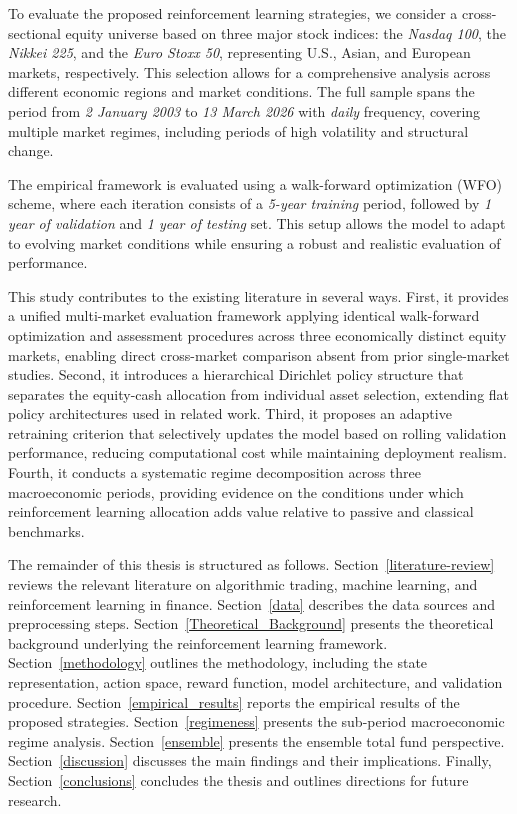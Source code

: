 \documentclass[]{elsarticle}
\begin{document}
To evaluate the proposed reinforcement learning strategies, we consider a cross-sectional equity universe based on three major stock indices: the \textit{Nasdaq 100}, the \textit{Nikkei 225}, and the \textit{Euro Stoxx 50}, representing U.S., Asian, and European markets, respectively. This selection allows for a comprehensive analysis across different economic regions and market conditions. The full sample spans the period from \textit{2 January 2003} to \textit{13 March 2026} with \textit{daily} frequency, covering multiple market regimes, including periods of high volatility and structural change.

The empirical framework is evaluated using a walk-forward optimization (WFO) scheme, where each iteration consists of a \textit{5-year training} period, followed by \textit{1 year of validation} and \textit{1 year of testing} set. This setup allows the model to adapt to evolving market conditions while ensuring a robust and realistic evaluation of performance.

This study contributes to the existing literature in several ways. First, it provides a unified multi-market evaluation framework applying identical walk-forward optimization and assessment procedures across three economically distinct equity markets, enabling direct cross-market comparison absent from prior single-market studies. Second, it introduces a hierarchical Dirichlet policy structure that separates the equity-cash allocation from individual asset selection, extending flat policy architectures used in related work. Third, it proposes an adaptive retraining criterion that selectively updates the model based on rolling validation performance, reducing computational cost while maintaining deployment realism. Fourth, it conducts a systematic regime decomposition across three macroeconomic periods, providing evidence on the conditions under which reinforcement learning allocation adds value relative to passive and classical benchmarks.

The remainder of this thesis is structured as follows. Section~\ref{literature-review} reviews the relevant literature on algorithmic trading, machine learning, and reinforcement learning in finance. Section~\ref{data} describes the data sources and preprocessing steps. Section~\ref{Theoretical_Background} presents the theoretical background underlying the reinforcement learning framework. Section~\ref{methodology} outlines the methodology, including the state representation, action space, reward function, model architecture, and validation procedure. Section~\ref{empirical_results} reports the empirical results of the proposed strategies. Section~\ref{regimeness} presents the sub-period macroeconomic regime analysis. Section~\ref{ensemble} presents the ensemble total fund perspective. Section~\ref{discussion} discusses the main findings and their implications. Finally, Section~\ref{conclusions} concludes the thesis and outlines directions for future research.
\end{document}
